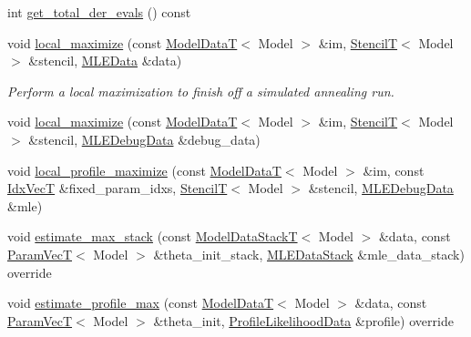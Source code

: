\begin{DoxyCompactItemize}
\item 
int \hyperlink{classmappel_1_1estimator_1_1IterativeMaximizer_aa522c84aaaa2b745b3112e9fd2cf4fc9}{get\+\_\+total\+\_\+der\+\_\+evals} () const 
\item 
void \hyperlink{classmappel_1_1estimator_1_1IterativeMaximizer_a35bda016bda047cdd6816ed1a8f76d30}{local\+\_\+maximize} (const \hyperlink{namespacemappel_a97f050df953605381ae9c901c3b125f1}{Model\+DataT}$<$ Model $>$ \&im, \hyperlink{namespacemappel_a3a06598240007876f8c4bf834ad86197}{StencilT}$<$ Model $>$ \&stencil, \hyperlink{namespacemappel_1_1estimator_structmappel_1_1estimator_1_1MLEData}{M\+L\+E\+Data} \&data)
\begin{DoxyCompactList}\small\item\em Perform a local maximization to finish off a simulated annealing run. \end{DoxyCompactList}\item 
void \hyperlink{classmappel_1_1estimator_1_1IterativeMaximizer_a2fd6152953dcc530a23350dcc93baf7c}{local\+\_\+maximize} (const \hyperlink{namespacemappel_a97f050df953605381ae9c901c3b125f1}{Model\+DataT}$<$ Model $>$ \&im, \hyperlink{namespacemappel_a3a06598240007876f8c4bf834ad86197}{StencilT}$<$ Model $>$ \&stencil, \hyperlink{namespacemappel_1_1estimator_structmappel_1_1estimator_1_1MLEDebugData}{M\+L\+E\+Debug\+Data} \&debug\+\_\+data)
\item 
void \hyperlink{classmappel_1_1estimator_1_1IterativeMaximizer_acc71726ed0876fd59ce3b07ea9950625}{local\+\_\+profile\+\_\+maximize} (const \hyperlink{namespacemappel_a97f050df953605381ae9c901c3b125f1}{Model\+DataT}$<$ Model $>$ \&im, const \hyperlink{namespacemappel_ac63743dcd42180127307cd0e4ecdd784}{Idx\+VecT} \&fixed\+\_\+param\+\_\+idxs, \hyperlink{namespacemappel_a3a06598240007876f8c4bf834ad86197}{StencilT}$<$ Model $>$ \&stencil, \hyperlink{namespacemappel_1_1estimator_structmappel_1_1estimator_1_1MLEDebugData}{M\+L\+E\+Debug\+Data} \&mle)
\item 
void \hyperlink{classmappel_1_1estimator_1_1ThreadedEstimator_a797b6479fbab450a42099cfdb07e900f}{estimate\+\_\+max\+\_\+stack} (const \hyperlink{namespacemappel_aaeb6665bc57476dd93c2df6ad8bc4768}{Model\+Data\+StackT}$<$ Model $>$ \&data, const \hyperlink{namespacemappel_a0f86d3153e4e27b095012f140eea58de}{Param\+VecT}$<$ Model $>$ \&theta\+\_\+init\+\_\+stack, \hyperlink{namespacemappel_1_1estimator_structmappel_1_1estimator_1_1MLEDataStack}{M\+L\+E\+Data\+Stack} \&mle\+\_\+data\+\_\+stack) override
\item 
void \hyperlink{classmappel_1_1estimator_1_1ThreadedEstimator_a16ce4964abd0e18da2f9ec7e8bd5b4ee}{estimate\+\_\+profile\+\_\+max} (const \hyperlink{namespacemappel_a97f050df953605381ae9c901c3b125f1}{Model\+DataT}$<$ Model $>$ \&data, const \hyperlink{namespacemappel_a0f86d3153e4e27b095012f140eea58de}{Param\+VecT}$<$ Model $>$ \&theta\+\_\+init, \hyperlink{namespacemappel_1_1estimator_structmappel_1_1estimator_1_1ProfileLikelihoodData}{Profile\+Likelihood\+Data} \&profile) override

\end{DoxyCompactItemize}
